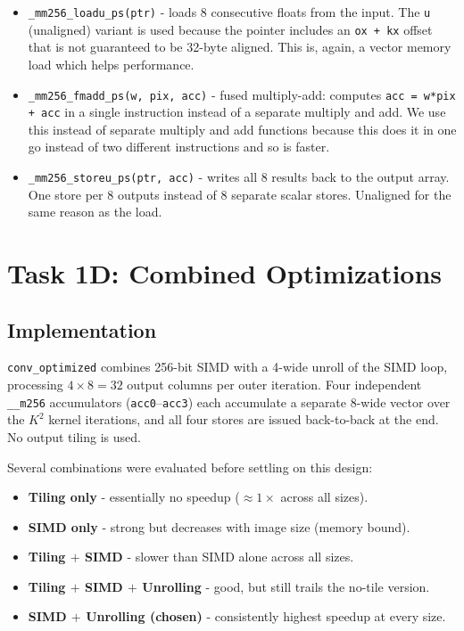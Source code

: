 \documentclass[11pt]{article}
\begin{document}
\begin{enumerate}[leftmargin=1.6em, itemsep=0.3em]
\begin{itemize}[leftmargin=1.4em, itemsep=0.2em]
        \item \texttt{\_mm256\_loadu\_ps(ptr)} - loads 8 consecutive floats
        from the input. The \texttt{u} (unaligned) variant is used because the
        pointer includes an \texttt{ox\,+\,kx} offset that is not guaranteed to
        be 32-byte aligned. This is, again, a vector memory load which helps performance.
        \item \texttt{\_mm256\_fmadd\_ps(w, pix, acc)} - fused multiply-add:
        computes \texttt{acc = w*pix + acc} in a single instruction instead of
        a separate multiply and add. We use this instead of separate multiply and add functions because this
        does it in one go instead of two different instructions and so is faster.
        \item \texttt{\_mm256\_storeu\_ps(ptr, acc)} - writes all 8 results
        back to the output array. One store per 8 outputs instead of 8 separate
        scalar stores. Unaligned for the same reason as the load.
    \end{itemize}
\end{enumerate}

\section{Task 1D: Combined Optimizations}

\subsection{Implementation}

\texttt{conv\_optimized} combines 256-bit SIMD with a 4-wide unroll of the
SIMD loop, processing $4 \times 8 = 32$ output columns per outer iteration.
Four independent \texttt{\_\_m256} accumulators (\texttt{acc0}--\texttt{acc3})
each accumulate a separate 8-wide vector over the $K^2$ kernel iterations, and all
four stores are issued back-to-back at the end. No output tiling is used.

Several combinations were evaluated before settling on this design:

\begin{itemize}[leftmargin=1.4em, itemsep=0.2em]
    \item \textbf{Tiling only} - essentially no speedup ($\approx 1\times$ across all sizes).
    \item \textbf{SIMD only} - strong but decreases with image size (memory bound).
    \item \textbf{Tiling $+$ SIMD} - slower than SIMD alone across all sizes.
    \item \textbf{Tiling $+$ SIMD $+$ Unrolling} - good, but still trails the no-tile version.
    \item \textbf{SIMD $+$ Unrolling (chosen)} - consistently highest speedup at every size.
\end{itemize}
\end{document}

